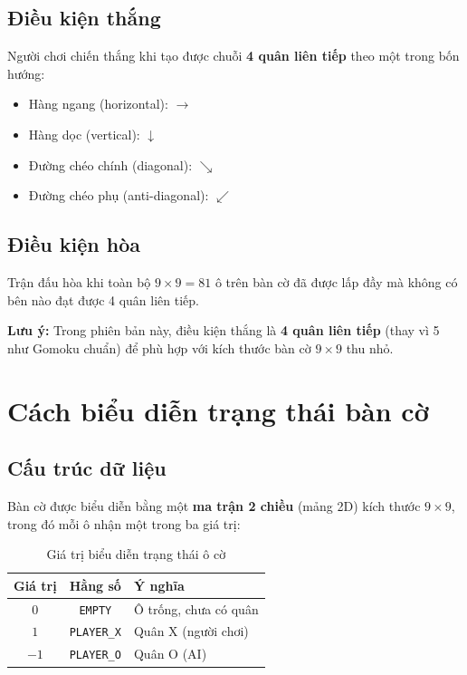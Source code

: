 \documentclass[12pt,a4paper]{article}
\begin{document}
\subsection{Điều kiện thắng}

Người chơi chiến thắng khi tạo được chuỗi \textbf{4 quân liên tiếp} theo một trong bốn hướng:
\begin{itemize}
    \item Hàng ngang (horizontal): $\rightarrow$
    \item Hàng dọc (vertical): $\downarrow$
    \item Đường chéo chính (diagonal): $\searrow$
    \item Đường chéo phụ (anti-diagonal): $\swarrow$
\end{itemize}

\subsection{Điều kiện hòa}

Trận đấu hòa khi toàn bộ $9 \times 9 = 81$ ô trên bàn cờ đã được lấp đầy mà không có bên nào đạt được 4 quân liên tiếp.

\textbf{Lưu ý:} Trong phiên bản này, điều kiện thắng là \textbf{4 quân liên tiếp} (thay vì 5 như Gomoku chuẩn) để phù hợp với kích thước bàn cờ $9 \times 9$ thu nhỏ.

\section{Cách biểu diễn trạng thái bàn cờ}

\subsection{Cấu trúc dữ liệu}

Bàn cờ được biểu diễn bằng một \textbf{ma trận 2 chiều} (mảng 2D) kích thước $9 \times 9$, trong đó mỗi ô nhận một trong ba giá trị:

\begin{table}[H]
\centering
\caption{Giá trị biểu diễn trạng thái ô cờ}
\begin{tabular}{ccl}
\toprule
\textbf{Giá trị} & \textbf{Hằng số} & \textbf{Ý nghĩa} \\
\midrule
$0$  & \texttt{EMPTY}    & Ô trống, chưa có quân \\
$1$  & \texttt{PLAYER\_X} & Quân X (người chơi) \\
$-1$ & \texttt{PLAYER\_O} & Quân O (AI) \\
\bottomrule
\end{tabular}
\end{table}
\end{document}

